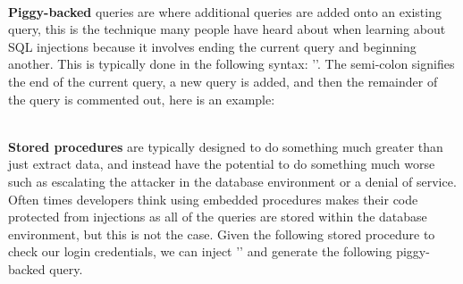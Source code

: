 \noindent
{}
\\

\textbf{Piggy-backed} queries are where additional queries are added onto an existing query, this is the technique many people have heard about when learning about SQL injections because it involves ending the current query and beginning another.  This is typically done in the following syntax: ''.  The semi-colon signifies the end of the current query, a new query is added, and then the remainder of the query is commented out, here is an example:

\noindent
{}
\\

\textbf{Stored procedures} are typically designed to do something much greater than just extract data, and instead have the potential to do something much worse such as escalating the attacker in the database environment or a denial of service.  Often times developers think using embedded procedures makes their code protected from injections as all of the queries are stored within the database environment, but this is not the case. Given the following stored procedure to check our login credentials, we can inject '' and generate the following piggy-backed query.

\noindent
{}
\\

\noindent
{}

